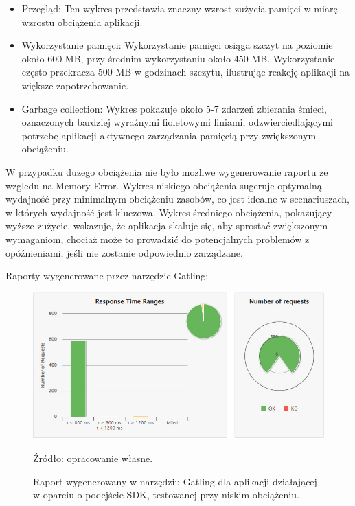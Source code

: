 \documentclass[runningheads,12pt]{llncs}
\begin{document}
\begin{itemize}
    \item Przegląd: Ten wykres przedstawia znaczny wzrost zużycia pamięci w miarę wzrostu obciążenia aplikacji.
    \item Wykorzystanie pamięci: Wykorzystanie pamięci osiąga szczyt na poziomie około 600 MB, przy średnim wykorzystaniu około 450 MB. Wykorzystanie często przekracza 500 MB w godzinach szczytu, ilustrując reakcję aplikacji na większe zapotrzebowanie.
    \item Garbage collection: Wykres pokazuje około 5-7 zdarzeń zbierania śmieci, oznaczonych bardziej wyraźnymi fioletowymi liniami, odzwierciedlającymi potrzebę aplikacji aktywnego zarządzania pamięcią przy zwiększonym obciążeniu.
\end{itemize}

W przypadku duzego obciążenia nie było mozliwe wygenerowanie raportu ze wzgledu na Memory Error.
Wykres niskiego obciążenia sugeruje optymalną wydajność przy minimalnym obciążeniu zasobów, co jest idealne w scenariuszach, w których wydajność jest kluczowa. Wykres średniego obciążenia, pokazujący wyższe zużycie, wskazuje, że aplikacja skaluje się, aby sprostać zwiększonym wymaganiom, chociaż może to prowadzić do potencjalnych problemów z opóźnieniami, jeśli nie zostanie odpowiednio zarządzane.

\newpage


Raporty wygenerowane przez narzędzie Gatling:

\begin{figure}
    \centering
    \includegraphics[width=0.8\linewidth]{images/sdk-gatling-low-graph.jpg}
    \caption{Raport wygenerowany w narzędziu Gatling dla aplikacji działającej w oparciu o podejście SDK, testowanej przy niskim obciążeniu.}
    \label{fig:low}
    \vspace{0.5em}
    {\small Źródło: opracowanie własne.}
\end{figure}
\end{document}
